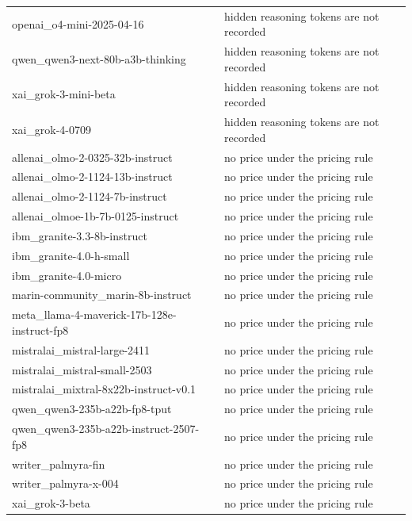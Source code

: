 \begin{longtable}{lp{7cm}}
openai\_o4-mini-2025-04-16 & hidden reasoning tokens are not recorded \\
qwen\_qwen3-next-80b-a3b-thinking & hidden reasoning tokens are not recorded \\
xai\_grok-3-mini-beta & hidden reasoning tokens are not recorded \\
xai\_grok-4-0709 & hidden reasoning tokens are not recorded \\
allenai\_olmo-2-0325-32b-instruct & no price under the pricing rule \\
allenai\_olmo-2-1124-13b-instruct & no price under the pricing rule \\
allenai\_olmo-2-1124-7b-instruct & no price under the pricing rule \\
allenai\_olmoe-1b-7b-0125-instruct & no price under the pricing rule \\
ibm\_granite-3.3-8b-instruct & no price under the pricing rule \\
ibm\_granite-4.0-h-small & no price under the pricing rule \\
ibm\_granite-4.0-micro & no price under the pricing rule \\
marin-community\_marin-8b-instruct & no price under the pricing rule \\
meta\_llama-4-maverick-17b-128e-instruct-fp8 & no price under the pricing rule \\
mistralai\_mistral-large-2411 & no price under the pricing rule \\
mistralai\_mistral-small-2503 & no price under the pricing rule \\
mistralai\_mixtral-8x22b-instruct-v0.1 & no price under the pricing rule \\
qwen\_qwen3-235b-a22b-fp8-tput & no price under the pricing rule \\
qwen\_qwen3-235b-a22b-instruct-2507-fp8 & no price under the pricing rule \\
writer\_palmyra-fin & no price under the pricing rule \\
writer\_palmyra-x-004 & no price under the pricing rule \\
xai\_grok-3-beta & no price under the pricing rule \\
\end{longtable}
